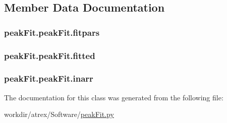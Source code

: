 \subsection{Member Data Documentation}
\hypertarget{classpeak_fit_1_1peak_fit_a7bcef9f3d5dbca4a5470a53661dabe4c}{
\subsubsection[{fitpars}]{\setlength{\rightskip}{0pt plus 5cm}peak\-Fit.\-peak\-Fit.\-fitpars}}\label{classpeak_fit_1_1peak_fit_a7bcef9f3d5dbca4a5470a53661dabe4c}
\hypertarget{classpeak_fit_1_1peak_fit_a1d06c78ecd07718ae71cc50df4d0251c}{
\subsubsection[{fitted}]{\setlength{\rightskip}{0pt plus 5cm}peak\-Fit.\-peak\-Fit.\-fitted}}\label{classpeak_fit_1_1peak_fit_a1d06c78ecd07718ae71cc50df4d0251c}
\hypertarget{classpeak_fit_1_1peak_fit_a46bbd242120c1eb44158673fc1ba69eb}{
\subsubsection[{inarr}]{\setlength{\rightskip}{0pt plus 5cm}peak\-Fit.\-peak\-Fit.\-inarr}}\label{classpeak_fit_1_1peak_fit_a46bbd242120c1eb44158673fc1ba69eb}


The documentation for this class was generated from the following file\-:\begin{DoxyCompactItemize}
\item 
workdir/atrex/\-Software/\hyperlink{peak_fit_8py}{peak\-Fit.\-py}\end{DoxyCompactItemize}
